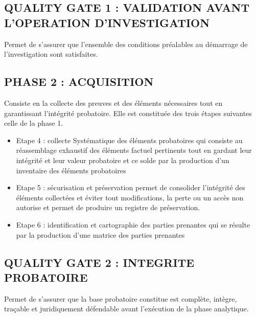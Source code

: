 \documentclass{article}
\begin{document}
\subsection*{QUALITY GATE 1 : VALIDATION AVANT L’OPERATION D’INVESTIGATION}
Permet de s’assurer que l’ensemble des conditions préalables au démarrage de l’investigation sont satisfaites.
\subsection*{PHASE 2 : ACQUISITION}
Consiste en la collecte des preuves et des éléments nécessaires tout en garantissant l’intégrité probatoire. Elle est constituée des trois étapes suivantes celle de la phase 1.
\begin{itemize}
	\item Etape 4 : collecte Systématique des éléments probatoires qui consiste au réassemblage exhaustif des éléments factuel pertinents tout en gardant leur intégrité et leur valeur probatoire et ce solde par la production d’un inventaire des éléments probatoires
	\item Etape 5 : sécurisation et préservation permet de consolider l’intégrité des éléments collectées et éviter tout modifications, la perte ou un accès non autorise et permet de produire un registre de préservation.
	\item Etape 6 : identification et cartographie des parties prenantes qui se résulte par la production d’une matrice des parties prenantes
\end{itemize}
\subsection*{QUALITY GATE 2 : INTEGRITE PROBATOIRE}
Permet de s’assurer que la base probatoire constitue est complète, intègre, traçable et juridiquement défendable avant l’exécution de la phase analytique.
\end{document}
